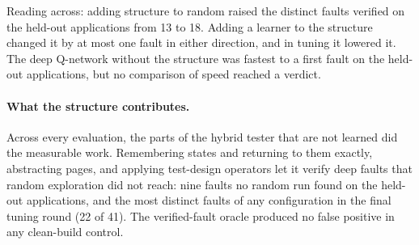 \begin{table}[H]
\centering
\small
\caption{The main arms as an ablation of structure and learning. Held-out: distinct faults
of 24 and restricted mean $T$. Tuning: distinct faults of 41. External: mean branch
coverage over the six applications, in round 1, with heuristic custom clickables (post-hoc)
and in round 2 (listener-based clickables, v5).}
\label{tab:ablation}
\end{table}

Reading across: adding structure to random raised the distinct faults verified on the
held-out applications from 13 to 18. Adding a learner to the structure changed it by at most
one fault in either direction, and in tuning it lowered it. The deep Q-network without the
structure was fastest to a first fault on the held-out applications, but no comparison of
speed reached a verdict.

\paragraph{What the structure contributes.} Across every evaluation, the parts of the hybrid
tester that are not learned did the measurable work. Remembering states and returning to
them exactly, abstracting pages, and applying test-design operators let it verify deep
faults that random exploration did not reach: nine faults no random run found on the
held-out applications, and the most distinct faults of any configuration in the final tuning
round (22 of 41). The verified-fault oracle produced no false positive in any clean-build
control.

